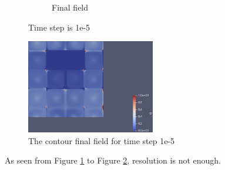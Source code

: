 \documentclass{article}
\begin{document}
\begin{figure}[hbt!]
\begin{subfigure}{0.4\textwidth}
        \caption{Final field}
  \end{subfigure}
  \caption{Time step is 1e-5}
  \label{t3m3_1} 
\end{figure}

\begin{figure}[hbt!]
    \centering
    \includegraphics[width=0.5\textwidth]{Figures/e-5 80x80/contour.png}
    \caption{The contour final field for time step 1e-5}
    \label{t3m3_2} 
\end{figure}

As seen from Figure \ref{t3m3_1} to Figure \ref{t3m3_2}, resolution is not enough.


\clearpage
\end{document}
